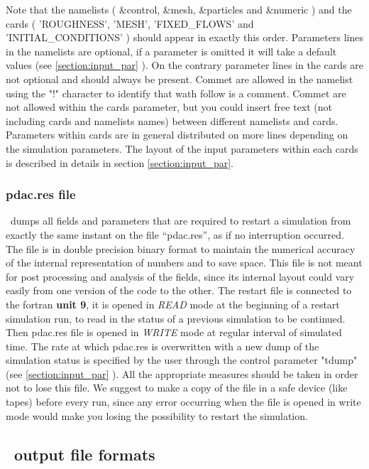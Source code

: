 Note that the namelists ( \&control, \&mesh, \&particles and \&numeric )
and the cards ( 'ROUGHNESS', 'MESH', 'FIXED\_FLOWS' and 'INITIAL\_CONDITIONS' )
should appear in exactly this order. 
Parameters lines in the namelists are optional, if a parameter is omitted
it will take a default values (see \ref{section:input_par} ).
On the contrary parameter lines in the cards are not optional and
should always be present.
Commet are allowed in the namelist using the "!" character to identify 
that wath follow is a comment. Commet are not allowed within the cards
parameter, but you could insert free text (not including cards and namelists names)
between different namelists and cards.
Parameters within cards are in general distributed on more lines depending
on the simulation parameters. The layout of the input parameters 
within each cards is described in details in section \ref{section:input_par}.

\subsubsection{pdac.res file}
\label{section:pdac_res}

\PDAC\ dumps all fields and parameters that are required to restart a 
simulation from exactly the same instant on the file ``pdac.res'',
as if no interruption occurred. The file is in double precision 
binary format to maintain the numerical accuracy of the internal 
representation of numbers and to save space. 
This file is not meant for post processing
and analysis of the fields, since its internal layout could
vary easily from one version of the code to the other.
The restart file is connected to the fortran {\bf unit 9}, it is
opened in {\it READ} mode at the beginning of a restart simulation run,
to read in the status of a previous simulation to be continued.
Then pdac.res file is opened in {\it WRITE} mode at regular interval
of simulated time. The rate at which pdac.res is overwritten
with a new dump of the simulation status is specified by
the user through the control parameter "tdump" 
(see \ref{section:input_par} ).
All the appropriate measures should be taken in order
not to lose this file. We suggest to make a copy of the file in 
a safe device (like tapes) before every run, since any error occurring
when the file is opened in write mode would make you losing the possibility
to restart the simulation.

\subsection{\PDAC\ output file formats}
\label{section:output_files}

